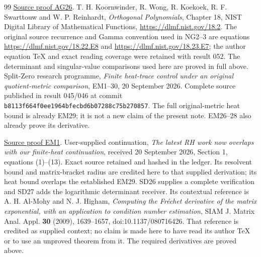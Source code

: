 \documentclass[11pt]{article}
\begin{document}
\begin{thebibliography}{99}
\href{https://github.com/KokunoYumeto/zeta-function-research-reader/blob/5992ad50c0f2a06921f1fcaded7b4e38097c0739/workbenches/splitzero-tandem/continuations/20260920-original-kernel-mixed-determinants/providers/ABSOLUTE_GAMMA_AND_ACTION.tex\#L358}{Source proof AG26}.
 T. H. Koornwinder, R. Wong, R. Koekoek,
R. F. Swarttouw and W. P. Reinhardt, \emph{Orthogonal Polynomials},
Chapter 18, NIST Digital Library of Mathematical Functions,
\url{https://dlmf.nist.gov/18.2}. The original source recurrence and
Gamma convention used in NG2--3 are equations
\url{https://dlmf.nist.gov/18.22.E8} and
\url{https://dlmf.nist.gov/18.23.E7}; the author equation TeX and exact
reading coverage were retained with result 052. The determinant and
singular-value comparisons used here are proved in full above.
 Split-Zero research programme, \emph{Finite heat-trace
control under an original quotient-metric comparison}, EM1--30,
20 September 2026. Complete source published in result 045/046 at
commit \nolinkurl{b8113f664f0ee1964bfecbd6b07288c75b270857}.
The full original-metric heat bound is already EM29; it is not a new
claim of the present note. EM26--28 also already prove its derivative.

\href{https://github.com/KokunoYumeto/zeta-function-research-reader/blob/5992ad50c0f2a06921f1fcaded7b4e38097c0739/workbenches/splitzero-tandem/continuations/20260920-original-kernel-mixed-determinants/providers/ENDPOINT_METRIC_HEAT.tex\#L38}{Source proof EM1}.
 User-supplied continuation, \emph{The latest RH
work now overlaps with our finite-heat continuation}, received
20 September 2026, Section 1, equations (1)--(13). Exact source retained
and hashed in the ledger. Its resolvent bound and matrix-bracket radius
are credited here to that supplied derivation; its heat bound overlaps
the established EM29. SD26 supplies a complete verification and SD27 adds the logarithmic
determinant receiver. Its contextual reference is A. H. Al-Mohy and
N. J. Higham, \emph{Computing the Fr\'echet derivative of the matrix
exponential, with an application to condition number estimation},
SIAM J. Matrix Anal. Appl. \textbf{30} (2009), 1639--1657,
doi:10.1137/080716426. That reference is credited as supplied context;
no claim is made here to have read its author TeX or to use an unproved
theorem from it. The required derivatives are proved above.




\end{thebibliography}
\end{document}
